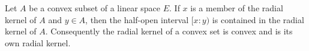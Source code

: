 Let $A$ be a convex subset of a linear space $E$. If $x$ is a member of the radial kernel of $A$ and $y \in A$, then the half-open interval $[x:y)$ is contained in the radial kernel of $A$. Consequently the radial kernel of a convex set is convex and is its own radial kernel.
